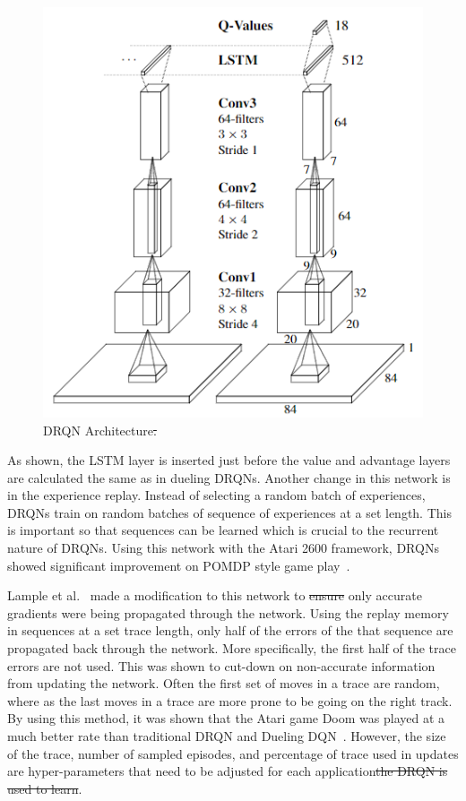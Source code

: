 \documentclass[12pt,american]{report}
\providecommand{\DIFaddtex}[1]{{\protect\color{blue}\uwave{#1}}} %
\providecommand{\DIFdeltex}[1]{{\protect\color{red}\sout{#1}}}                      %
\providecommand{\DIFaddbegin}{} %
\providecommand{\DIFaddend}{} %
\providecommand{\DIFdelbegin}{} %
\providecommand{\DIFdelend}{} %
\providecommand{\DIFaddFL}[1]{\DIFadd{#1}} %
\providecommand{\DIFdelFL}[1]{\DIFdel{#1}} %
\providecommand{\DIFaddbeginFL}{} %
\providecommand{\DIFaddendFL}{} %
\providecommand{\DIFdelbeginFL}{} %
\providecommand{\DIFdelendFL}{} %
\providecommand{\DIFadd}[1]{\texorpdfstring{\DIFaddtex{#1}}{#1}} %
\providecommand{\DIFdel}[1]{\texorpdfstring{\DIFdeltex{#1}}{}} %
\newcommand{\DIFscaledelfig}{0.5}
\newlength{\DIFdelgraphicswidth} %
\newlength{\DIFdelgraphicsheight} %
\newcommand{\DIFaddincludegraphics}[2][]{{\color{blue}\fbox{\DIFOincludegraphics[#1]{#2}}}} %
\newcommand{\DIFdelincludegraphics}[2][]{%
\sbox{\DIFdelgraphicsbox}{\DIFOincludegraphics[#1]{#2}}%
\settoboxwidth{\DIFdelgraphicswidth}{\DIFdelgraphicsbox} %
\settoboxtotalheight{\DIFdelgraphicsheight}{\DIFdelgraphicsbox} %
\scalebox{\DIFscaledelfig}{%
\parbox[b]{\DIFdelgraphicswidth}{\usebox{\DIFdelgraphicsbox}\\[-\baselineskip] \rule{\DIFdelgraphicswidth}{0em}}\llap{\resizebox{\DIFdelgraphicswidth}{\DIFdelgraphicsheight}{%
\setlength{\unitlength}{\DIFdelgraphicswidth}%
\begin{picture}(1,1)%
\thicklines\linethickness{2pt} %
{\color[rgb]{1,0,0}\put(0,0){\framebox(1,1){}}}%
{\color[rgb]{1,0,0}\put(0,0){\line( 1,1){1}}}%
{\color[rgb]{1,0,0}\put(0,1){\line(1,-1){1}}}%
\end{picture}%
}\hspace*{3pt}}} %
} %
\DeclareRobustCommand{\DIFaddbegin}{\DIFOaddbegin \let\includegraphics\DIFaddincludegraphics} %
\DeclareRobustCommand{\DIFaddend}{\DIFOaddend \let\includegraphics\DIFOincludegraphics} %
\DeclareRobustCommand{\DIFdelbegin}{\DIFOdelbegin \let\includegraphics\DIFdelincludegraphics} %
\DeclareRobustCommand{\DIFdelend}{\DIFOaddend \let\includegraphics\DIFOincludegraphics} %
\DeclareRobustCommand{\DIFaddbeginFL}{\DIFOaddbeginFL \let\includegraphics\DIFaddincludegraphics} %
\DeclareRobustCommand{\DIFaddendFL}{\DIFOaddendFL \let\includegraphics\DIFOincludegraphics} %
\DeclareRobustCommand{\DIFdelbeginFL}{\DIFOdelbeginFL \let\includegraphics\DIFdelincludegraphics} %
\DeclareRobustCommand{\DIFdelendFL}{\DIFOaddendFL \let\includegraphics\DIFOincludegraphics} %
\begin{document}
\begin{figure}
\centering
\includegraphics[scale=1]{images/drqn-arch.png}
\caption{DRQN Architecture\DIFdelbeginFL \DIFdelFL{.}\DIFdelendFL ~\cite{HausknechtDRQN}\DIFaddbeginFL \DIFaddFL{.}\DIFaddendFL }
\label{fig:drqn-arch}
\end{figure}

As shown, the LSTM layer is inserted just before the value and advantage layers are calculated the same as in dueling DRQNs. Another change in this network is in the experience replay.  Instead of selecting a random batch of experiences, DRQNs train on random batches of sequence of experiences at a set length.  This is important so that sequences can be learned which is crucial to the recurrent nature of DRQNs. Using this network with the Atari 2600 framework, DRQNs showed significant improvement on POMDP style game play~\cite{HausknechtDRQN}. 

Lample et al.~\cite{DBLP:journals/corr/LampleC16} made a modification to this network to \DIFdelbegin \DIFdel{ensure }\DIFdelend \DIFaddbegin \DIFadd{encourage }\DIFaddend only accurate gradients were being propagated through the network. Using the replay memory in sequences at a set trace length, only half of the errors of the that sequence are propagated back through the network.  More specifically, the first half of the trace errors are not used.  This was shown to cut-down on non-accurate information from updating the network.  Often the first set of moves in a trace are random, where as the last moves in a trace are more prone to be going on the right track.  By using this method, it was shown that the Atari game Doom was played at a much better rate than traditional DRQN and Dueling DQN~\cite{DBLP:journals/corr/LampleC16}.  However, the size of the trace, number of sampled episodes, and percentage of trace used in updates are hyper-parameters that need to be adjusted for each application\DIFdelbegin \DIFdel{the DRQN is used to learn}\DIFdelend .
\end{document}
